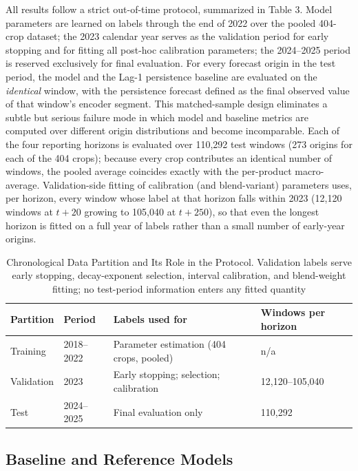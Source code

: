 \documentclass[review,3p,times]{elsarticle}
\begin{document}
All results follow a strict out-of-time protocol, summarized in Table 3. Model parameters are learned on labels through the end of 2022 over the pooled 404-crop dataset; the 2023 calendar year serves as the validation period for early stopping and for fitting all post-hoc calibration parameters; the 2024--2025 period is reserved exclusively for final evaluation. For every forecast origin in the test period, the model and the Lag-1 persistence baseline are evaluated on the \emph{identical} window, with the persistence forecast defined as the final observed value of that window's encoder segment. This matched-sample design eliminates a subtle but serious failure mode in which model and baseline metrics are computed over different origin distributions and become incomparable. Each of the four reporting horizons is evaluated over 110,292 test windows (273 origins for each of the 404 crops); because every crop contributes an identical number of windows, the pooled average coincides exactly with the per-product macro-average. Validation-side fitting of calibration (and blend-variant) parameters uses, per horizon, every window whose label at that horizon falls within 2023 (12,120 windows at $t+20$ growing to 105,040 at $t+250$), so that even the longest horizon is fitted on a full year of labels rather than a small number of early-year origins.

\begin{table}[htbp]\centering
\caption{Chronological Data Partition and Its Role in the Protocol. Validation labels serve early stopping, decay-exponent selection, interval calibration, and blend-weight fitting; no test-period information enters any fitted quantity}
\small
\begin{tabular}{llll}
\toprule
Partition & Period & Labels used for & Windows per horizon \\
\midrule
Training & 2018--2022 & Parameter estimation (404 crops, pooled) & n/a \\
Validation & 2023 & Early stopping; selection; calibration & 12,120--105,040 \\
Test & 2024--2025 & Final evaluation only & 110,292 \\
\bottomrule
\end{tabular}
\end{table}

\subsection{Baseline and Reference Models}
\end{document}
